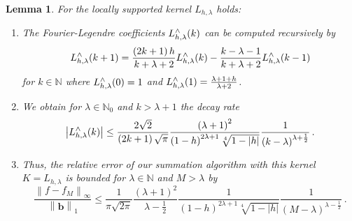 \documentclass[11pt,a4paper,twoside,bibtotoc]{scrartcl}
\theoremstyle{plain}
\newtheorem{lemma}[theorem]{Lemma}
\theoremstyle{definition}
\theoremstyle{remark}
\newcommand{\N}{\ensuremath{\mathbb{N}}}
\newcommand{\NZ}{\ensuremath{\mathbb{N}_{0}}}
\newcommand{\fun}[2]{\ensuremath{#1{\hspace{-0.4ex}}\left(#2\right)}}
\numberwithin{equation}{section}
\numberwithin{table}{section}
\numberwithin{figure}{section}
\begin{document}
\begin{lemma}
  For the locally supported kernel $L_{h,\lambda}$ holds:
  \begin{enumerate}
  \item The Fourier-Legendre coefficients $\fun{L_{h,\lambda}^{\wedge}}{k}$ can be computed recursively by
    \[
    \fun{L_{h,\lambda}^{\wedge}}{k+1} = \frac{\left(2k+1\right) h}{k+\lambda+2}
    \fun{L_{h,\lambda}^{\wedge}}{k}   - \frac{k-\lambda-1}{k+\lambda+2}
    \fun{L_{h,\lambda}^{\wedge}}{k-1}
    \]
    for $k\in \N$ where $\fun{L_{h,\lambda}^{\wedge}}{0} = 1$ and
    $\fun{L_{h,\lambda}^{\wedge}}{1} = \frac{\lambda + 1 + h}{\lambda+2}$.
  \item We obtain for $\lambda \in \NZ$ and $k>\lambda+1$ the decay rate
    \[
    \left|\fun{L_{h,\lambda}^{\wedge}}{k}\right| \le
    \frac{2\sqrt{2}}{\left(2k+1\right)\sqrt{\pi}}
    \frac{\left(\lambda+1\right)^2}{\left(1-h\right)^{2\lambda+1}\sqrt[4]{1-|h|}}
    \frac{1}{\left(k-\lambda\right)^{\lambda+\frac{1}{2}}}\,. 
    \]
  \item Thus, the relative error of our summation algorithm with this kernel
  $K=L_{h,\lambda}$ is bounded for $\lambda \in \N$ and $M>\lambda$ by
  \begin{equation}
    \label{error:Lh}
    \frac{\left\|f - f_{M}\right\|_{\infty}}{\left\|\mathbf{b}\right\|_1} \le
    \frac{1}{\pi\sqrt{2\pi}}
    \frac{\left(\lambda+1\right)^2}{\lambda-\frac{1}{2}}
    \frac{1}{\left(1-h\right)^{2\lambda+1}\sqrt[4]{1-|h|}}
    \frac{1}{\left(M-\lambda\right)^{\lambda-\frac{1}{2}}}\,.
  \end{equation}
  \end{enumerate}
\end{lemma}
\end{document}
